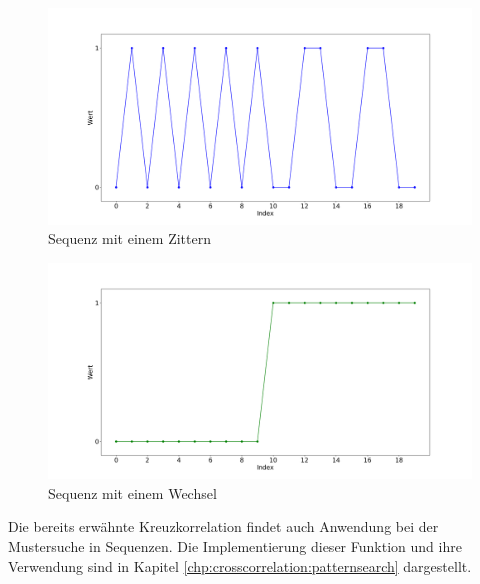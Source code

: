 \begin{figure}[H]
	\centering
	\includegraphics[scale=0.32]{images/sequences/tremor}
	\caption{Sequenz mit einem Zittern}
	\label{fig:classification-sequences-tremor}
\end{figure}

\begin{figure}[H]
	\centering
	\includegraphics[scale=0.32]{images/sequences/change}
	\caption{Sequenz mit einem Wechsel}
	\label{fig:classification-sequences-change}
\end{figure}

Die bereits erwähnte Kreuzkorrelation findet auch Anwendung bei der Mustersuche in Sequenzen. Die Implementierung dieser Funktion und ihre Verwendung sind in Kapitel \ref{chp:crosscorrelation:patternsearch} dargestellt.